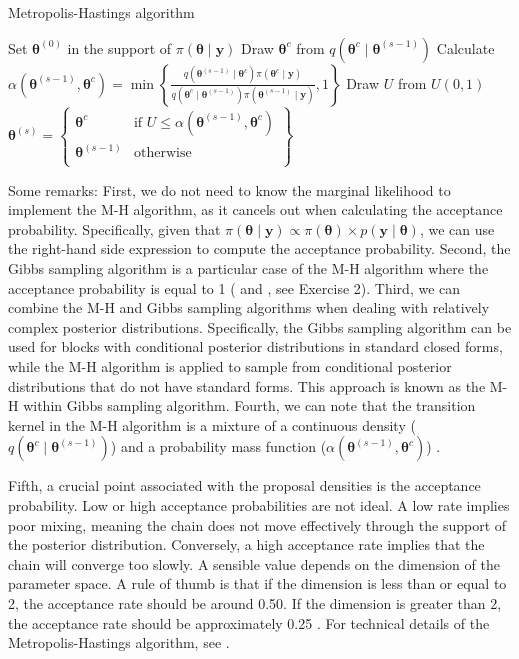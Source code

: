 \begin{algorithm}[h!]
	\caption{Metropolis-Hastings algorithm}\label{Alg:MH}
	\begin{algorithmic}[1]
		\State Set $\bm{\theta}^{(0)}$ in the support of $\pi(\bm{\theta}\mid \bm{y})$  		 			
		\State Draw $\bm{\theta}^{c}$ from $q(\bm{\theta}^{c}\mid \bm{\theta}^{(s-1)})$
		\State Calculate $\alpha(\bm{\theta}^{(s-1)}, \bm{\theta}^{c}) = 
		\min\left\{\frac{q(\bm{\theta}^{(s-1)} \mid  \bm{\theta}^{c}) \pi(\bm{\theta}^{c} \mid  \bm{y})}{q(\bm{\theta}^{c} \mid  \bm{\theta}^{(s-1)}) \pi(\bm{\theta}^{(s-1)} \mid  \bm{y})}, 1\right\}$
		\State Draw $U$ from $U(0,1)$
		\State $\bm{\theta}^{(s)}=\begin{Bmatrix}
			\bm{\theta}^{c} & \text{if } U\leq \alpha(\bm{\theta}^{(s-1)}, \bm{\theta}^{c})\\
			\bm{\theta}^{(s-1)} & \text{otherwise}\\
		\end{Bmatrix}$
		\EndFor 
	\end{algorithmic} 
\end{algorithm}

Some remarks: First, we do not need to know the marginal likelihood to implement the M-H algorithm, as it cancels out when calculating the acceptance probability. Specifically, given that $\pi(\bm{\theta}\mid \bm{y}) \propto \pi(\bm{\theta}) \times p(\bm{y}\mid \bm{\theta})$, we can use the right-hand side expression to compute the acceptance probability. Second, the Gibbs sampling algorithm is a particular case of the M-H algorithm where the acceptance probability is equal to 1 (\cite{Gelman1992} and \cite[Chap.~10]{robert2011monte}, see Exercise 2). Third, we can combine the M-H and Gibbs sampling algorithms when dealing with relatively complex posterior distributions. Specifically, the Gibbs sampling algorithm can be used for blocks with conditional posterior distributions in standard closed forms, while the M-H algorithm is applied to sample from conditional posterior distributions that do not have standard forms. This approach is known as the M-H within Gibbs sampling algorithm. Fourth, we can note that the transition kernel in the M-H algorithm is a mixture of a continuous density ($q(\bm{\theta}^{c} \mid  \bm{\theta}^{(s-1)})$) and a probability mass function ($\alpha(\bm{\theta}^{(s-1)}, \bm{\theta}^{c})$) \cite{chib1995understanding}. 

Fifth, a crucial point associated with the proposal densities is the acceptance probability. Low or high acceptance probabilities are not ideal. A low rate implies poor mixing, meaning the chain does not move effectively through the support of the posterior distribution. Conversely, a high acceptance rate implies that the chain will converge too slowly. A sensible value depends on the dimension of the parameter space. A rule of thumb is that if the dimension is less than or equal to 2, the acceptance rate should be around 0.50. If the dimension is greater than 2, the acceptance rate should be approximately 0.25 \cite{Roberts1997}. For technical details of the Metropolis-Hastings algorithm, see \cite[Chap.~7]{robert2011monte}.

